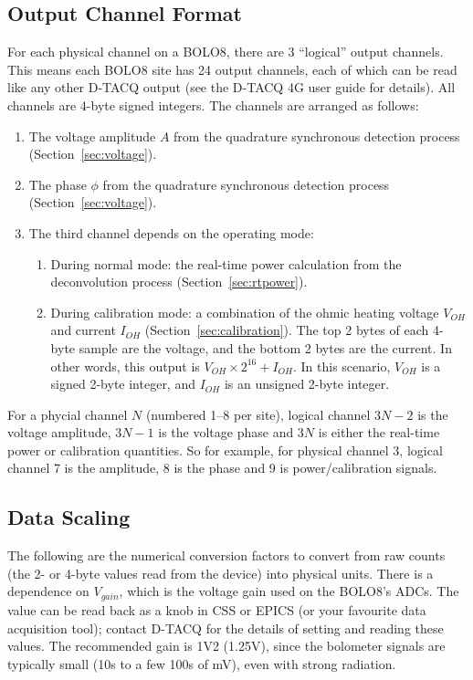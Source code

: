 \documentclass[12pt,a4paper]{article}
\begin{document}
\subsection{Output Channel Format}
\label{sec:channels}
For each physical channel on a BOLO8, there are 3 ``logical'' output channels. This means each BOLO8 site has 24 output channels, each of which can be read
like any other D-TACQ output (see the D-TACQ 4G user guide for details). All channels are 4-byte signed integers. The channels are arranged as follows:
\begin{enumerate}
\item{The voltage amplitude $A$ from the quadrature synchronous detection process (Section~\ref{sec:voltage}).}
\item{The phase $\phi$ from the quadrature synchronous detection process (Section~\ref{sec:voltage}).}
\item{The third channel depends on the operating mode:}
  \begin{enumerate}
  \item{During normal mode: the real-time power calculation from the deconvolution process (Section~\ref{sec:rtpower}).}
  \item{During calibration mode: a combination of the ohmic heating voltage $V_{OH}$ and current $I_{OH}$ (Section~\ref{sec:calibration}). The top 2 bytes of
      each 4-byte sample are the voltage, and the bottom 2 bytes are the current. In other words, this output is $V_{OH} \times 2^{16} + I_{OH}$. In this
      scenario, $V_{OH}$ is a signed 2-byte integer, and $I_{OH}$ is an unsigned 2-byte integer.}
  \end{enumerate}
\end{enumerate}

For a phycial channel $N$ (numbered 1--8 per site), logical channel $3N-2$ is the voltage amplitude, $3N-1$ is the voltage phase and $3N$ is either the
real-time power or calibration quantities. So for example, for physical channel 3, logical channel 7 is the amplitude, 8 is the phase and 9 is
power/calibration signals.

\subsection{Data Scaling}
\label{sec:scaling}
The following are the numerical conversion factors to convert from raw counts (the 2- or 4-byte values read from the device) into physical units. There is
a dependence on $V_{gain}$, which is the voltage gain used on the BOLO8's ADCs. The value can be read back as a knob in CSS or EPICS (or your favourite data
acquisition tool); contact D-TACQ for the details of setting and reading these values. The recommended gain is 1V2 (1.25V), since the bolometer signals are
typically small (10s to a few 100s of mV), even with strong radiation.
\end{document}
